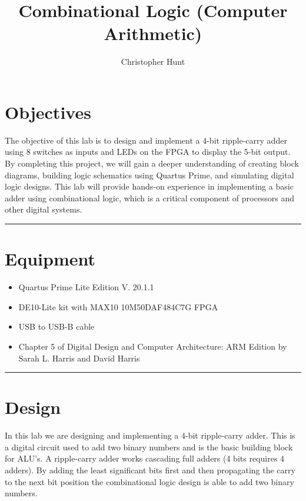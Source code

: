 \documentclass[11pt]{article}
\title{\textbf{{\huge Combinational Logic (Computer Arithmetic) }}}
\author{Christopher Hunt}
\date{}
\begin{document}
\pagestyle{fancy}
\fancyhf{}
\rhead{\thepage}
\maketitle
\section*{\textcolor{mycolor}{Objectives}}

The objective of this lab is to design and implement a 4-bit ripple-carry adder using 8 switches as inputs and LEDs on the FPGA to display the 5-bit output. By completing this project, we will gain a deeper understanding of creating block diagrams, building logic schematics using Quartus Prime, and simulating digital logic designs. This lab will provide hands-on experience in implementing a basic adder using combinational logic, which is a critical component of processors and other digital systems.
\vspace{5mm}
\hrule
\section*{\textcolor{mycolor}{Equipment}}
\begin{itemize}
  \item Quartus Prime Lite Edition V. 20.1.1
  \item DE10-Lite kit with MAX10 10M50DAF484C7G FPGA
  \item USB to USB-B cable
  \item Chapter 5 of Digital Design and Computer Architecture: ARM Edition by Sarah L. Harris and David Harris
\end{itemize}
\vspace{5mm}
\hrule
\section*{\textcolor{mycolor}{Design}}
In this lab we are designing and implementing a 4-bit ripple-carry adder. This is a digital circuit used to add two binary numbers and is the basic building block for ALU's. A ripple-carry adder works cascading full adders (4 bits requires 4 adders). By adding the least significant bits first and then propagating the carry to the next bit position the combinational logic design is able to add two binary numbers. 
\end{document}
